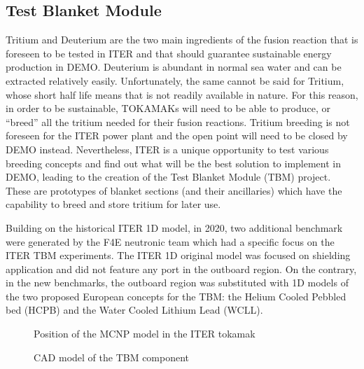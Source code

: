 \documentclass[letterpaper,10pt,english]{sphinxmanual}
\let\sphinxpxdimen\pdfpxdimen\else\newdimen\sphinxpxdimen
\begin{document}
\subsection{Test Blanket Module}
\label{\detokenize{usage/benchmarks:test-blanket-module}}
Tritium and Deuterium are the two main ingredients of the fusion reaction that is
foreseen to be tested in ITER and that should guarantee sustainable energy production
in DEMO. Deuterium is abundant in normal sea water and can be extracted relatively
easily. Unfortunately, the same cannot be said for Tritium, whose short half life
means that is not readily available in nature. For this reason, in order to be
sustainable, TOKAMAKs will need to be able to produce, or “breed” all the tritium
needed for their fusion reactions. Tritium breeding is not foreseen for the ITER
power plant and the open point will need to be closed by DEMO instead. Nevertheless,
ITER is a unique opportunity to test various breeding concepts and find out what
will be the best solution to implement in DEMO, leading to the creation of the
Test Blanket Module (TBM) project. These are prototypes of blanket sections (and
their ancillaries) which have the capability to breed and store tritium for later
use.

Building on the historical ITER 1D model, in 2020,
two additional benchmark were generated by the F4E neutronic
team which had a specific focus on the ITER TBM experiments. The ITER 1D original
model was focused on shielding application and did not feature any port in the
outboard region. On the contrary, in the new benchmarks, the outboard region was
substituted with 1D models of the two proposed European concepts for the TBM: the
Helium Cooled Pebbled bed (HCPB) and the Water Cooled Lithium Lead (WCLL).

\begin{figure}[htbp]
\centering
\capstart

\noindent\sphinxincludegraphics[width=600\sphinxpxdimen]{{ITERCAD}.png}
\caption{Position of the MCNP model in the ITER tokamak}\label{\detokenize{usage/benchmarks:id19}}\end{figure}

\begin{figure}[htbp]
\centering
\capstart

\noindent\sphinxincludegraphics[width=600\sphinxpxdimen]{{tbmCAD}.png}
\caption{CAD model of the TBM component}\label{\detokenize{usage/benchmarks:id20}}\end{figure}


\end{document}
